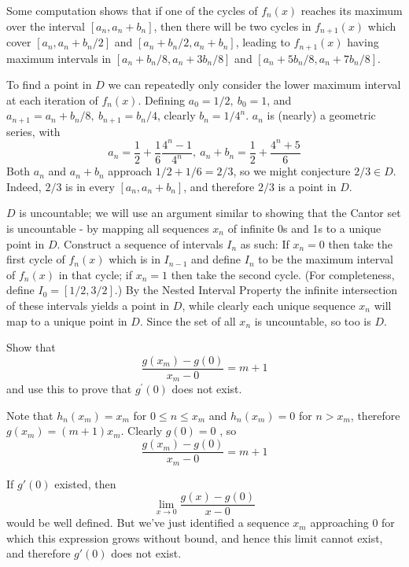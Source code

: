\begin{solution}
{Some computation shows that if one of the cycles of \(f_n(x)\) reaches its maximum over the interval \([a_n, a_n + b_n]\), then there will be two cycles in \(f_{n+1}(x)\) which cover \([a_n, a_n + b_n / 2]\) and \([a_n + b_n/2, a_n + b_n]\), leading to \(f_{n+1}(x)\) having maximum intervals in \([a_n + b_n/8, a_n + 3b_n/8]\) and \([a_n + 5b_n/8, a_n + 7b_n/8]\).

To find a point in \(D\) we can repeatedly only consider the lower maximum interval at each iteration of \(f_n(x)\). Defining \(a_0 = 1/2,\ b_0 = 1\), and \(a_{n+1} =a_n + b_n/8,\ b_{n+1} = b_n/4\), clearly \(b_n = 1/4^n\). \(a_n\) is (nearly) a geometric series, with
\[a_n = \frac{1}{2} + \frac{1}{6} \frac{4^n-1}{4^n},\ a_n + b_n = \frac{1}{2} + \frac{4^n + 5}{6}\]
Both \(a_n\) and \(a_n + b_n\) approach \(1/2 + 1/6 = 2/3\), so we might conjecture \(2/3 \in D\). Indeed, \(2/3\) is in every \([a_n, a_n + b_n]\), and therefore \(2/3\) is a point in \(D\).

\item \(D\) is uncountable; we will use an argument similar to showing that the Cantor set is uncountable - by mapping all sequences \(x_n\) of infinite 0s and 1s to a unique point in \(D\). Construct a sequence of intervals \(I_n\) as such: If \(x_n = 0\) then take the first cycle of \(f_n(x)\) which is in \(I_{n-1}\) and define \(I_n\) to be the maximum interval of \(f_n(x)\) in that cycle; if \(x_n = 1\) then take the second cycle. (For completeness, define \(I_0 = [1/2, 3/2]\).) By the Nested Interval Property the infinite intersection of these intervals yields a point in \(D\), while clearly each unique sequence \(x_n\) will map to a unique point in \(D\). Since the set of all \(x_n\) is uncountable, so too is \(D\).

}
\end{solution}

\begin{exercise}
Show that
$$
\frac{g\left(x_{m}\right)-g(0)}{x_{m}-0}=m+1
$$
and use this to prove that $g^{\prime}(0)$ does not exist.
\end{exercise}

\begin{solution}
Note that \(h_n(x_m) = x_m\) for \(0 \leq n \leq x_m\) and \(h_n(x_m) = 0\) for \(n > x_m\), therefore \(g(x_m) = (m + 1) x_m\). Clearly \(g(0) = 0\) , so
\[\frac{g\left(x_{m}\right)-g(0)}{x_{m}-0}=m+1\]

If \(g'(0)\) existed, then
\[\lim_{x \to 0} \frac{g(x)-g(0)}{x-0}\]
would be well defined. But we've just identified a sequence \(x_m\) approaching 0 for which this expression grows without bound, and hence this limit cannot exist, and therefore \(g'(0)\) does not exist.
\end{solution}

